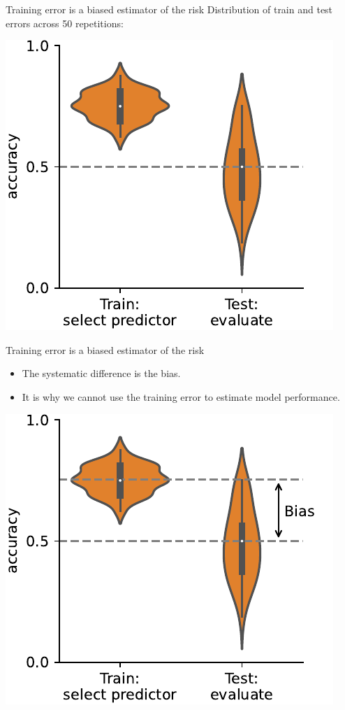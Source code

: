 \documentclass[presentation,mathserif,table]{beamer}
\begin{document}
\begin{frame}[label={sec:orgccf5df6}]{Training error is a biased estimator of the risk}
Distribution of train and test errors across 50 repetitions:
\begin{center}
\includegraphics[height=.5 \textheight]{figures/generated/select_evaluate_averaged/select_evaluate_averaged_1.pdf}
\end{center}
\end{frame}
\begin{frame}[label={sec:orgb0a873b}]{Training error is a biased estimator of the risk}
\begin{itemize}
\item The systematic difference is the bias.
\item It is why we cannot use the training error to estimate model performance.
\end{itemize}
\begin{center}
\includegraphics[height=.5 \textheight]{figures/generated/select_evaluate_averaged/select_evaluate_averaged_2.pdf}
\end{center}
\end{frame}
\end{document}
